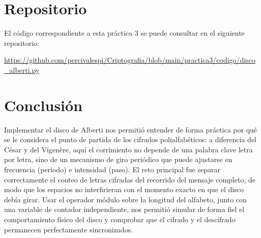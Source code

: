 \documentclass[letterpaper,12pt]{article}
\begin{document}
\section{Repositorio}

El código correspondiente a esta práctica 3 se puede consultar en el siguiente repositorio:

\url{https://github.com/percivalespi/Criptografia/blob/main/practica3/codigo/disco_alberti.py}

\section{Conclusión}

Implementar el disco de Alberti nos permitió entender de forma práctica por qué se le
considera el punto de partida de los cifrados polialfabéticos: a diferencia del César y del
Vigenère, aquí el corrimiento no depende de una palabra clave letra por letra, sino de un
mecanismo de giro periódico que puede ajustarse en frecuencia (periodo) e intensidad (paso).
El reto principal fue separar correctamente el conteo de letras cifradas del recorrido del
mensaje completo, de modo que los espacios no interfirieran con el momento exacto en que el
disco debía girar. Usar el operador módulo sobre la longitud del alfabeto, junto con una
variable de contador independiente, nos permitió simular de forma fiel el comportamiento
físico del disco y comprobar que el cifrado y el descifrado permanecen perfectamente
sincronizados.
\end{document}
